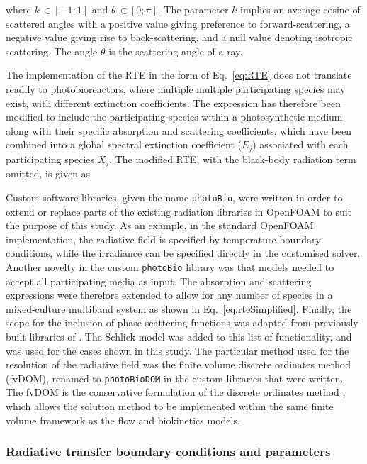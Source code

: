 
%
where $k \, \in [-1;1]$ and $\theta \, \in [0;\pi]$. The parameter $k$ implies an average cosine of scattered angles with a positive value giving preference to forward-scattering, a negative value giving rise to back-scattering, and a null value denoting isotropic scattering. The angle $\theta$ is the scattering angle of a ray.
\skippingparagraph

The implementation of the RTE in the form of Eq.\ \ref{eq:RTE} does not translate readily to photobioreactors, where multiple multiple participating species may exist, with different extinction coefficients. The expression has therefore been modified to include the participating species within a photosynthetic medium along with their specific absorption and scattering coefficients, which have been combined into a global spectral extinction coefficient ($E_j$) associated with each participating species $X_j$. The modified RTE, with the black-body radiation term omitted, is given as



Custom software libraries, given the name \texttt{photoBio}, were written in order to extend or replace parts of the existing radiation libraries in OpenFOAM to suit the purpose of this study. As an example, in the standard OpenFOAM implementation, the radiative field is specified by temperature boundary conditions, while the irradiance can be specified directly in the customised solver.  Another novelty in the custom \texttt{photoBio} library was that models needed to accept all participating media as input. The absorption and scattering expressions were therefore extended to allow for any number of species in a mixed-culture multiband system as shown in Eq.\ \ref{eq:rteSimplified}. Finally, the scope for the inclusion of phase scattering functions was adapted from previously built libraries of \cite{kong2014}. The Schlick model was added to this list of functionality, and was used for the cases shown in this study.
\skippingparagraph
The particular method used for the resolution of the radiative field was the finite volume discrete ordinates method (fvDOM), renamed to \texttt{photoBioDOM} in the custom libraries that were written. The fvDOM is the conservative formulation of the discrete ordinates method \cite{raithby1990}, which allows the solution method to be implemented within the same finite volume framework as the flow and biokinetics models.


\subsubsection{Radiative transfer boundary conditions and parameters}

